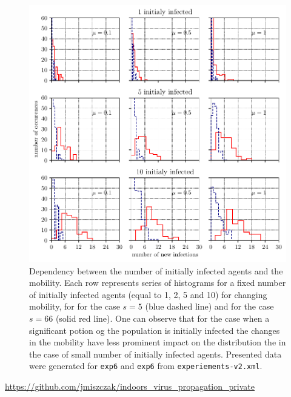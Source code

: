 \documentclass[10pt,a4paper]{article}
\begin{document}
\begin{figure}[ht!]
\begin{center}
\includegraphics[scale=0.75]{plots/plot_pop100_world-1_exp6_exp7_hist.pdf}
\end{center}
\caption{Dependency between the number of initially infected agents and the mobility. Each row represents series of histograms for a fixed number of initially infected agents (equal to 1, 2, 5 and 10) for changing mobility, for for the case $s=5$ (blue dashed line) and for the case $s=66$ (solid red line). One can observe that for the case when a significant potion og the population is initially infected the changes in the mobility have less prominent impact on the distribution the in the case of small number of initially infected agents. Presented data were generated for \texttt{exp6} and \texttt{exp6} from  \texttt{experiements-v2.xml}.}
\label{fig:exp6_pop100_world-1_hist}
\end{figure}

\begin{thebibliography}{1}
 \url{https://github.com/jmiszczak/indoors_virus_propagation_private}
\end{thebibliography}
\end{document}
